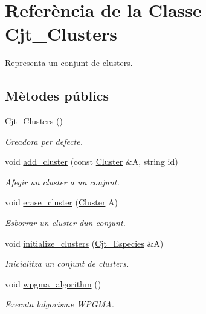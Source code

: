 \hypertarget{class_cjt___clusters}{}\section{Referència de la Classe Cjt\+\_\+\+Clusters}
\label{class_cjt___clusters}


Representa un conjunt de clusters.  


\subsection*{Mètodes públics}
\begin{DoxyCompactItemize}
\item 
\hyperlink{class_cjt___clusters_a2e55759944a78043744103e19dd87c1c}{Cjt\+\_\+\+Clusters} ()
\begin{DoxyCompactList}\small\item\em Creadora per defecte. \end{DoxyCompactList}\item 
void \hyperlink{class_cjt___clusters_ace64164c455de6b3e91b774ad95d93ac}{add\+\_\+cluster} (const \hyperlink{class_cluster}{Cluster} \&A, string id)
\begin{DoxyCompactList}\small\item\em Afegir un cluster a un conjunt. \end{DoxyCompactList}\item 
void \hyperlink{class_cjt___clusters_a779452d093c92ec42e47987a84ea48ff}{erase\+\_\+cluster} (\hyperlink{class_cluster}{Cluster} A)
\begin{DoxyCompactList}\small\item\em Esborrar un cluster d\textquotesingle{}un conjunt. \end{DoxyCompactList}\item 
void \hyperlink{class_cjt___clusters_a35d2c4c28bee51017f4ac9049a0fe6e9}{initialize\+\_\+clusters} (\hyperlink{class_cjt___especies}{Cjt\+\_\+\+Especies} \&A)
\begin{DoxyCompactList}\small\item\em Inicialitza un conjunt de clusters. \end{DoxyCompactList}\item 
void \hyperlink{class_cjt___clusters_ac2bf2811c291533e3516ad4de8240d36}{wpgma\+\_\+algorithm} ()
\begin{DoxyCompactList}\small\item\em Executa l\textquotesingle{}algorisme W\+P\+G\+MA. \end{DoxyCompactList}\item 

\end{DoxyCompactItemize}
